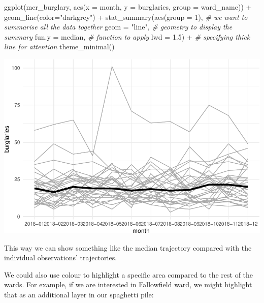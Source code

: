 \documentclass[
]{book}
\makeatletter
\newenvironment{Shaded}{\begin{snugshade}}{\end{snugshade}}
\newcommand{\AttributeTok}[1]{\textcolor[rgb]{0.61,0.61,0.61}{#1}}
\newcommand{\CommentTok}[1]{\textcolor[rgb]{0.37,0.37,0.37}{\textit{#1}}}
\newcommand{\DecValTok}[1]{\textcolor[rgb]{0.06,0.06,0.06}{#1}}
\newcommand{\FloatTok}[1]{\textcolor[rgb]{0.06,0.06,0.06}{#1}}
\newcommand{\FunctionTok}[1]{\textcolor[rgb]{0,0,0}{#1}}
\newcommand{\NormalTok}[1]{#1}
\newcommand{\SpecialCharTok}[1]{\textcolor[rgb]{0,0,0}{#1}}
\newcommand{\StringTok}[1]{\textcolor[rgb]{0.5,0.5,0.5}{#1}}
\newenvironment{kframe}{%
\medskip{}
\setlength{\fboxsep}{.8em}
 \def\at@end@of@kframe{}%
 \ifinner\ifhmode%
  \def\at@end@of@kframe{\end{minipage}}%
  \begin{minipage}{\columnwidth}%
 \fi\fi%
 \def\FrameCommand##1{\hskip\@totalleftmargin \hskip-\fboxsep
 \colorbox{shadecolor}{##1}\hskip-\fboxsep
     \hskip-\linewidth \hskip-\@totalleftmargin \hskip\columnwidth}%
 \MakeFramed {\advance\hsize-\width
   \@totalleftmargin\z@ \linewidth\hsize
   \@setminipage}}%
 {\par\unskip\endMakeFramed%
 \at@end@of@kframe}
\renewenvironment{Shaded}{\begin{kframe}}{\end{kframe}}
\makeatother
\begin{document}
\begin{Shaded}
\begin{Highlighting}[]
\FunctionTok{ggplot}\NormalTok{(mcr\_burglary, }
       \FunctionTok{aes}\NormalTok{(}\AttributeTok{x =}\NormalTok{ month, }
           \AttributeTok{y =}\NormalTok{ burglaries, }
           \AttributeTok{group =}\NormalTok{ ward\_name)) }\SpecialCharTok{+} 
  \FunctionTok{geom\_line}\NormalTok{(}\AttributeTok{color=}\StringTok{"darkgrey"}\NormalTok{) }\SpecialCharTok{+} 
  \FunctionTok{stat\_summary}\NormalTok{(}\FunctionTok{aes}\NormalTok{(}\AttributeTok{group =} \DecValTok{1}\NormalTok{), }\CommentTok{\# we want to summarise all the data together}
               \AttributeTok{geom =} \StringTok{"line"}\NormalTok{,  }\CommentTok{\# geometry to display the summary }
               \AttributeTok{fun.y =}\NormalTok{ median, }\CommentTok{\# function to apply}
              \AttributeTok{lwd =} \FloatTok{1.5}\NormalTok{) }\SpecialCharTok{+}   \CommentTok{\# specifying thick line for attention}
  \FunctionTok{theme\_minimal}\NormalTok{()}
\end{Highlighting}
\end{Shaded}

\includegraphics{crime_mapping_files/figure-latex/unnamed-chunk-182-1.pdf}

This way we can show something like the median trajectory compared with the individual observations' trajectories.

We could also use colour to highlight a specific area compared to the rest of the wards. For example, if we are interested in Fallowfield ward, we might highlight that as an additional layer in our spaghetti pile:
\end{document}
